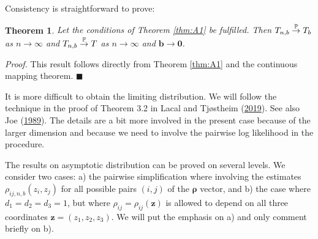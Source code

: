 \documentclass[
  12pt,
  letterpaper]{article}
\newtheorem{thm}{Theorem}[section]
\numberwithin{equation}{section}
\newcommand{\z}{\bm{z}}
\newcommand{\frho}{\bm{\rho}}
\newcommand{\bb}{\bm{b}}
\begin{document}
Consistency is straightforward to prove:

\begin{thm}
Let the conditions of Theorem \ref{thm:A1} be fulfilled. Then $T_{n,b} \buildrel {\mathbb{P}} \over {\to} T_b$ as $n \to \infty$ and $T_{n,b} \buildrel {\mathbb{P}} \over {\to} T$ as $n \to \infty$ and $\bb \to \bm{0}$.
\label{thm:F1}
\end{thm}

\emph{Proof.} This result follows directly from Theorem \ref{thm:A1} and the continuous mapping theorem. \(\blacksquare\)

It is more difficult to obtain the limiting distribution. We will follow the technique in the proof of Theorem 3.2 in Lacal and Tjøstheim (\protect\hyperlink{ref-lacal2018estimating}{2019}). See also Joe (\protect\hyperlink{ref-joe1989estimation}{1989}). The details are a bit more involved in the present case because of the larger dimension and because we need to involve the pairwise log likelihood in the procedure.

The results on asymptotic distribution can be proved on several levels. We consider two cases: a) the pairwise simplification where involving the estimates \(\rho_{ij,n,b}(z_i,z_j)\) for all possible pairs \((i,j)\) of the \(\frho\) vector, and b) the case where \(d_1=d_2=d_3=1\), but where \(\rho_{ij} = \rho_{ij}(\z)\) is allowed to depend on all three coordinates \(\z=(z_1,z_2,z_3)\). We will put the emphasis on a) and only comment briefly on b).
\end{document}
